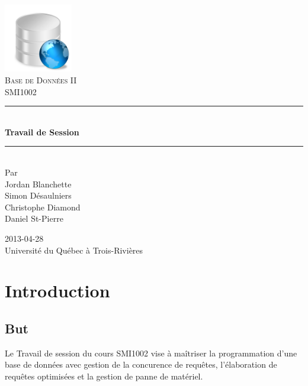 \documentclass[11pt,french]{article}
\newcommand{\HRule}{\rule{\linewidth}{0.5mm}}
\begin{document}
    \begin{titlepage}
        \begin{center}
    
            \includegraphics[height=3cm]{./aux/bd1.png}
            \\[3cm]
            
            \textsc{\LARGE Base de Données II}
            \\[0.2cm]
            \textsc{\Large SMI1002}
            \\[2cm]
            \HRule \\[0.5cm]
            {\huge \bfseries Travail de Session}
            \HRule \\[2cm]
            Par\\
            Jordan Blanchette\\
            Simon Désaulniers\\
            Christophe Diamond\\
            Daniel St-Pierre

            \vfill
            2013-04-28\\
            Université du Québec à Trois-Rivières
            \thispagestyle{empty}
        \end{center}
    \end{titlepage}
    \newpage
    
    \setcounter{page}{1}
    \tableofcontents
    \newpage

    \setcounter{page}{1}

    \section*{Introduction} %
    \label{sec:Introduction}
        \subsection*{But} %
        \label{sub:but}
            Le Travail de session du cours SMI1002 vise à maîtriser la programmation d'une base
            de données avec gestion de la concurence de requêtes, l'élaboration de requêtes optimisées
            et la gestion de panne de matériel.
\end{document}
